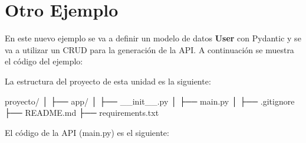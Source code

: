 \documentclass[
  a4paper,
  DIV=11,
  numbers=noendperiod,
  onepage,
  openany]{scrreprt}
\newenvironment{Shaded}{\begin{snugshade}}{\end{snugshade}}
\newcommand{\NormalTok}[1]{\textcolor[rgb]{0.00,0.23,0.31}{#1}}
\begin{document}
\chapter{Otro Ejemplo}\label{otro-ejemplo}

En este nuevo ejemplo se va a definir un modelo de datos \textbf{User}
con Pydantic y se va a utilizar un CRUD para la generación de la API. A
continuación se muestra el código del ejemplo:

La estructura del proyecto de esta unidad es la siguiente:

\begin{Shaded}
\begin{Highlighting}[]
\NormalTok{proyecto/}
\NormalTok{│}
\NormalTok{├── app/}
\NormalTok{│   ├── \_\_init\_\_.py}
\NormalTok{│   ├── main.py}
\NormalTok{│}
\NormalTok{├── .gitignore}
\NormalTok{├── README.md}
\NormalTok{├── requirements.txt}
\end{Highlighting}
\end{Shaded}

El código de la API (main.py) es el siguiente:
\end{document}

